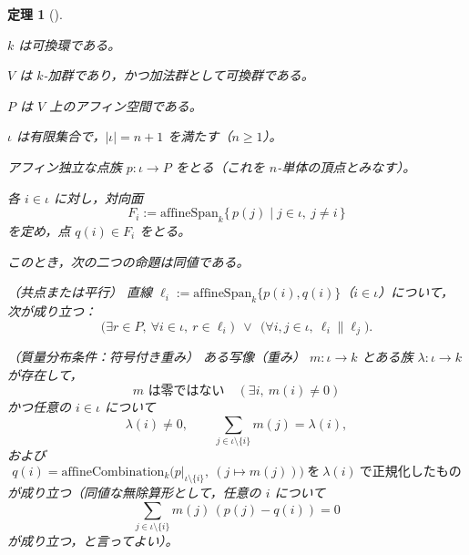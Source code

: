 \documentclass[a4paper,12pt]{bxjsbook}
\newlength{\customindent}
\newenvironment{body}{
  \par
  \begingroup
  \setlength{\leftskip}{\customindent}
  \setlength{\rightskip}{0pt}
  \setlength{\parindent}{1em}
  \setlength{\displayindent}{\customindent}
  \setlength{\displaywidth}{\dimexpr\linewidth-\customindent\relax}
}{
  \par
  \endgroup
}
\theoremstyle{theorem}
\newtheorem{theorem}{定理}[chapter]
\begin{document}
\begin{body}
    \begin{theorem}[]
        \begin{theoremenumerate}[label=(P\arabic*), leftmargin=4em, topsep=2pt, partopsep=0pt,
            itemsep=0pt, parsep=0pt]
            \item $k$ は可換環である。
            \item $V$ は $k$-加群であり，かつ加法群として可換群である。
            \item $P$ は $V$ 上のアフィン空間である。
            \item $\iota$ は有限集合で，$|\iota|=n+1$ を満たす（$n\ge 1$）。
            \item アフィン独立な点族 $p:\iota\to P$ をとる（これを $n$-単体の頂点とみなす）。
            \item 各 $i\in\iota$ に対し，対向面
            \[
            F_i := \mathrm{affineSpan}_k\{\,p(j)\mid j\in\iota,\ j\neq i\,\}
            \]
            を定め，点 $q(i)\in F_i$ をとる。
        \end{theoremenumerate}

        このとき，次の二つの命題は同値である。

        \begin{theoremitemize}[leftmargin=4em, topsep=2pt, partopsep=0pt, itemsep=0pt, parsep=0pt]
            \item[(A)] （共点または平行）
            直線 $\ell_i := \mathrm{affineSpan}_k\{p(i),q(i)\}$（$i\in\iota$）について，
            次が成り立つ：
            \[
            \Big(\exists r\in P,\ \forall i\in\iota,\ r\in \ell_i\Big)
            \ \ \lor\ \
            \Big(\forall i,j\in\iota,\ \ell_i\parallel \ell_j\Big).
            \]
            \item[(B)] （質量分布条件：符号付き重み）
            ある写像（重み） $m:\iota\to k$ とある族 $\lambda:\iota\to k$ が存在して，
            \[
            \text{$m$ は零ではない}\quad(\exists i,\ m(i)\neq 0)
            \]
            かつ任意の $i\in\iota$ について
            \[
            \lambda(i)\neq 0,\qquad
            \sum_{j\in\iota\setminus\{i\}} m(j)=\lambda(i),
            \]
            および
            \[
            q(i)=\mathrm{affineCombination}_k\bigl(p|_{\iota\setminus\{i\}},\
            (j\mapsto m(j))\bigr)\ \text{を}\ \lambda(i)\ \text{で正規化したもの}
            \]
            が成り立つ（同値な無除算形として，任意の $i$ について
            \[
            \sum_{j\in\iota\setminus\{i\}} m(j)\,(p(j)-q(i))=0
            \]
            が成り立つ，と言ってよい）。
        \end{theoremitemize}
    \end{theorem}


\end{body}
\end{document}
